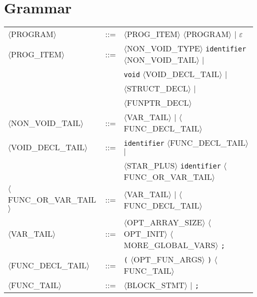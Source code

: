 \chapter{Grammar}\label{app:grammar}

\begin{footnotesize}
\begin{longtable}{>{\raggedright\arraybackslash}p{4cm}@{\ }>{\raggedright\arraybackslash}p{1.5cm}@{\ }>{\raggedright\arraybackslash}p{8.5cm}}
      $\langle$PROGRAM$\rangle$ & ::= & $\langle$PROG\_ITEM$\rangle$ $\langle$PROGRAM$\rangle$ $\mid$ $\varepsilon$ \\
      
      $\langle$PROG\_ITEM$\rangle$ & ::= & $\langle$NON\_VOID\_TYPE$\rangle$ \texttt{identifier} $\langle$NON\_VOID\_TAIL$\rangle$ $\mid$ \\
      & & \texttt{void} $\langle$VOID\_DECL\_TAIL$\rangle$ $\mid$ \\
      & & $\langle$STRUCT\_DECL$\rangle$ $\mid$ \\
      & & $\langle$FUNPTR\_DECL$\rangle$ \\
      
      $\langle$NON\_VOID\_TAIL$\rangle$ & ::= & $\langle$VAR\_TAIL$\rangle$ $\mid$ $\langle$FUNC\_DECL\_TAIL$\rangle$ \\
      
      $\langle$VOID\_DECL\_TAIL$\rangle$ & ::= & \texttt{identifier} $\langle$FUNC\_DECL\_TAIL$\rangle$ $\mid$ \\
      & & $\langle$STAR\_PLUS$\rangle$ \texttt{identifier} $\langle$FUNC\_OR\_VAR\_TAIL$\rangle$ \\
      
      $\langle$FUNC\_OR\_VAR\_TAIL$\rangle$ & ::= & $\langle$VAR\_TAIL$\rangle$ $\mid$ $\langle$FUNC\_DECL\_TAIL$\rangle$ \\
      
      $\langle$VAR\_TAIL$\rangle$ & ::= & $\langle$OPT\_ARRAY\_SIZE$\rangle$ $\langle$OPT\_INIT$\rangle$ $\langle$MORE\_GLOBAL\_VARS$\rangle$ \texttt{;} \\
      
      $\langle$FUNC\_DECL\_TAIL$\rangle$ & ::= & \texttt{(} $\langle$OPT\_FUN\_ARGS$\rangle$ \texttt{)} $\langle$FUNC\_TAIL$\rangle$ \\
      
      $\langle$FUNC\_TAIL$\rangle$ & ::= & $\langle$BLOCK\_STMT$\rangle$ $\mid$ \texttt{;} \\
      

\end{longtable}
\end{footnotesize}
